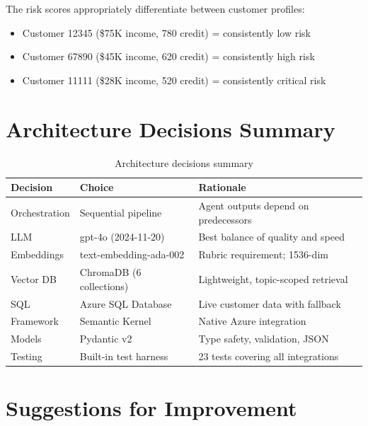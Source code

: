 \documentclass[12pt,a4paper]{article}
\begin{document}
The risk scores appropriately differentiate between customer profiles:
\begin{itemize}
    \item Customer 12345 (\$75K income, 780 credit) = consistently low risk
    \item Customer 67890 (\$45K income, 620 credit) = consistently high risk
    \item Customer 11111 (\$28K income, 520 credit) = consistently critical risk
\end{itemize}

\section{Architecture Decisions Summary}

\begin{table}[H]
\centering
\begin{tabular}{lll}
\toprule
\textbf{Decision} & \textbf{Choice} & \textbf{Rationale} \\
\midrule
Orchestration & Sequential pipeline & Agent outputs depend on predecessors \\
LLM & gpt-4o (2024-11-20) & Best balance of quality and speed \\
Embeddings & text-embedding-ada-002 & Rubric requirement; 1536-dim \\
Vector DB & ChromaDB (6 collections) & Lightweight, topic-scoped retrieval \\
SQL & Azure SQL Database & Live customer data with fallback \\
Framework & Semantic Kernel & Native Azure integration \\
Models & Pydantic v2 & Type safety, validation, JSON \\
Testing & Built-in test harness & 23 tests covering all integrations \\
\bottomrule
\end{tabular}
\caption{Architecture decisions summary}
\end{table}

\section{Suggestions for Improvement}
\end{document}
